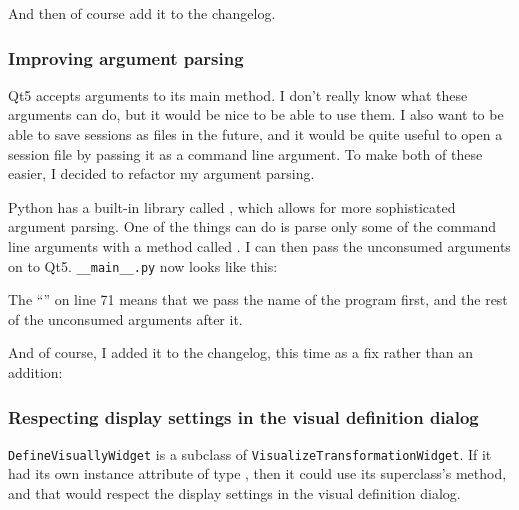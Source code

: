 \documentclass[../development.tex]{subfiles}
\begin{document}


And then of course add it to the changelog.


\subsubsection{Improving argument parsing\label{development:making-v0.2.2:improving-argument-parsing}}

Qt5 accepts arguments to its main method. I don't really know what these arguments can do, but it would be nice to be able to use them. I also want to be able to save sessions as files in the future, and it would be quite useful to open a session file by passing it as a command line argument. To make both of these easier, I decided to refactor my argument parsing.

Python has a built-in library called , which allows for more sophisticated argument parsing. One of the things  can do is parse only some of the command line arguments with a method called \cite{argparse-parse-known-args}. I can then pass the unconsumed arguments on to Qt5. \texttt{__main__.py} now looks like this:


The \enquote{} on line 71 means that we pass the name of the program first, and the rest of the unconsumed arguments after it.

And of course, I added it to the changelog, this time as a fix rather than an addition:


\subsubsection{Respecting display settings in the visual definition dialog\label{development:making-v0.2.2:respecting-display-settings-in-the-visual-definition-dialog}}

\texttt{DefineVisuallyWidget} is a subclass of \texttt{VisualizeTransformationWidget}. If it had its own instance attribute of type , then it could use its superclass's  method, and that would respect the display settings in the visual definition dialog.
\end{document}
